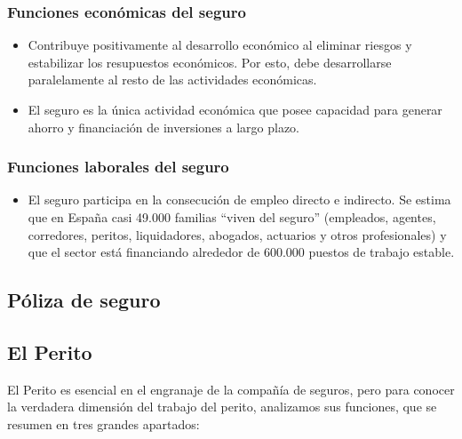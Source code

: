 \subsubsection{Funciones económicas del seguro}

\begin{itemize}
	\item Contribuye positivamente al desarrollo económico al eliminar riesgos y estabilizar los resupuestos económicos. Por esto, debe desarrollarse paralelamente al resto de las actividades económicas.

	\item El seguro es la única actividad económica que posee capacidad para generar ahorro y financiación de inversiones a largo plazo.%

\end{itemize}

\subsubsection{Funciones laborales del seguro}

\begin{itemize}

	\item El seguro participa en la consecución de empleo directo e indirecto. Se estima que en España casi 49.000 familias “viven del seguro” (empleados, agentes, corredores, peritos, liquidadores, abogados, actuarios y otros profesionales) y que el sector está financiando alrededor de 600.000 puestos de trabajo estable.

\end{itemize}

\subsection{Póliza de seguro}
\setlength{\parskip}{5mm}

\setlength{\parskip}{0mm}

\subsection{El Perito}
\setlength{\parskip}{5mm}
	El Perito es esencial en el engranaje de la compañía de seguros, pero para conocer la verdadera dimensión del trabajo del perito, analizamos sus funciones, que se resumen en tres grandes apartados:


